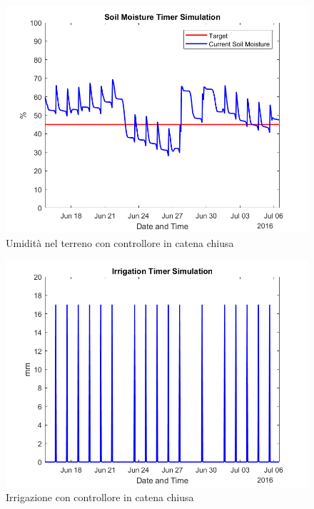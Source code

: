 \documentclass[conference,10pt]{IEEEtran}
\begin{document}
\begin{figure}[ht]
	\centering
	\includegraphics[width=0.9\linewidth]{images/soil_moisture_timer.png}
	\caption{Umidità nel terreno con controllore in catena chiusa}
	\label{fig:MAD}
\end{figure}
\begin{figure}[ht]
	\centering
	\includegraphics[width=0.9\linewidth]{images/irrigation_timer.png}
	\caption{Irrigazione con controllore in catena chiusa}
	\label{fig:MAD}
\end{figure}
\end{document}
